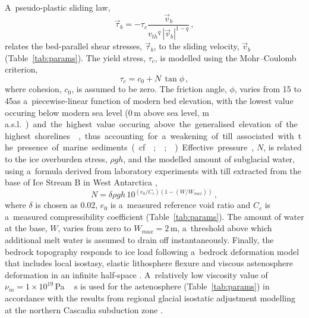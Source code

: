 \documentclass[tc, manuscript]{copernicus}
\begin{document}
      A~pseudo-plastic sliding law,
\begin{equation}
    \label{eqn:pseudoplastic}
    \vec{\tau}_b = -\tau_c \frac{\vec{v}_b}{{v_{th}}^q\,|\vec{v}_b|^{1-q}} \,,
\end{equation}
      relates the bed-parallel shear stresses, $\vec{\tau}_b$, to the
      sliding velocity, $\vec{v}_b$ (Table~\ref{tab:params}). The yield
      stress, $\tau_c$, is modelled using the Mohr--Coulomb criterion,
\begin{equation}
   \tau_c = c_0 + N\,\tan{\phi} \,,
\end{equation}
      where cohesion, $c_0$, is assumed to be zero. The friction angle,
      $\phi$, varies from 15 to 45\degree as a~piecewise-linear function of
      modern bed elevation, with the lowest value occuring below modern sea
      level (0\,\unit{m} above sea level, \unit{m\,a.s.l.}) and the highest
      value occuring above the generalised elevation of the highest
      shorelines \citep[200\,\unit{m\,a.s.l.},][Fig.~5]{Clague.1981}, thus
      accounting for a~weakening of till associated with the presence of
      marine sediments (cf. \citealp{Martin.etal.2011};
      \citealp[supplement]{Aschwanden.etal.2013};
      \citealp{PISM-authors.2015}). Effective pressure, $N$, is related to
      the ice overburden stress, $\rho gh$, and the modelled amount of
      subglacial water, using a~formula derived from laboratory experiments
      with till extracted from the base of Ice Stream B in West Antarctica
      \citep{Tulaczyk.etal.2000, Bueler.Pelt.2015},
\begin{equation}
    N = \delta \rho gh \, 10^{(e_0/C_c) (1 - (W/W_{max}))} \,,
\end{equation}
      where $\delta$ is chosen as 0.02, $e_0$ is a~measured reference void
      ratio and $C_c$ is a~measured compressibility coefficient
      (Table~\ref{tab:params}). The amount of water at the base, $W$, varies
      from zero to $W_{max}=2$\,\unit{m}, a~threshold above which additional
      melt water is assumed to drain off instantaneously. Finally, the
      bedrock topography responds to ice load following a~bedrock
      deformation model that includes local isostasy, elastic lithosphere
      flexure and viscous astenosphere deformation in an infinite half-space
      \citep{Lingle.Clark.1985,Bueler.etal.2007}. A~relatively low viscosity
      value of $\nu_m = 1\times10^{19}$\,\unit{Pa\,s} is used for the
      astenosphere (Table~\ref{tab:params}) in accordance with the results
      from regional glacial isostatic adjustment modelling at the northern
      Cascadia subduction zone \citep{James.etal.2009}.
\end{document}
